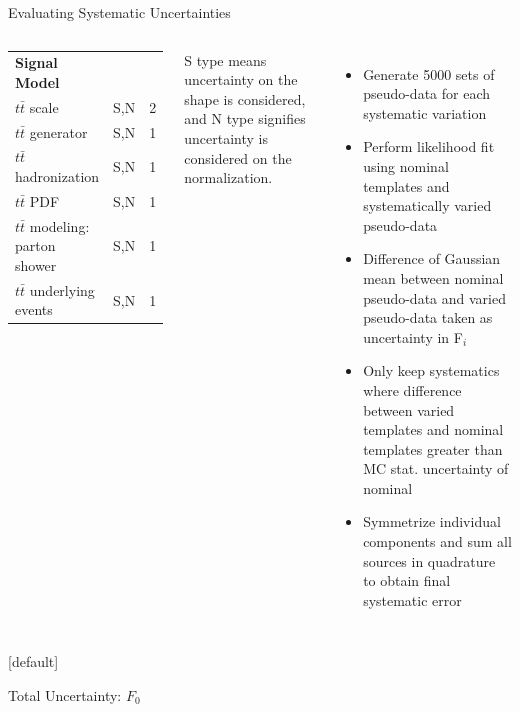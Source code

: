\documentclass{beamer}
\newcommand*{\fo}{\ensuremath{F_{\text{0}}}\xspace}
\begin{document}
{\begin{frame}{Evaluating Systematic Uncertainties}
\begin{columns}
\begin{table}
\begin{center}
\begin{tabular}{lcc}
          {\bf Signal Model}                 &   & \\
          $t\bar{t}$ scale           & S,N & 2 \\
          $t\bar{t}$ generator       & S,N & 1 \\
          $t\bar{t}$ hadronization   & S,N & 1 \\
          $t\bar{t}$ PDF   & S,N & 1 \\
          $t\bar{t}$ modeling: parton shower & S,N & 1\\
          $t\bar{t}$ underlying events & S,N & 1\\
          \hline\hline
        \end{tabular}
        \end{center}       
      \end{table}
      \vspace{-10pt}
      \tiny *S type means uncertainty on the shape is considered, and N type signifies uncertainty is considered on the normalization.
      \begin{itemize}
        \footnotesize
      \item Generate 5000 sets of pseudo-data for each systematic variation
      \item Perform likelihood fit using nominal templates and systematically varied pseudo-data
      \item Difference of Gaussian mean between nominal pseudo-data and varied pseudo-data taken as uncertainty in F$_i$ 
      \item Only keep systematics where difference between varied templates and nominal templates greater than MC stat. uncertainty of nominal
      \item Symmetrize individual components and sum all sources in quadrature to obtain final systematic error
      \end{itemize}
    \end{columns}


  \end{frame}

  \makeatletter %
  [default]
  \def\beamer@entrycode{\vspace*{-1.075\headheight}}
  \begin{frame}{Total Uncertainty: \fo}
    \begin{columns}
      \vspace{-14pt}
      \begin{table}[h!]\fontsize{5}{6}\selectfont
        \centering
        

\end{table}
\end{columns}
\end{frame}}
\end{document}
